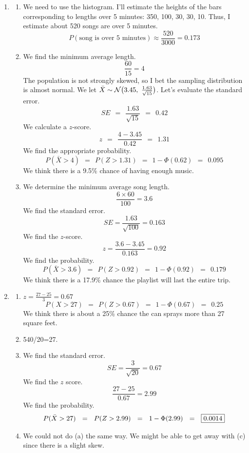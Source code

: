 \documentclass[12pt,letterpaper]{article}
\begin{document}
\begin{enumerate}
\item \begin{enumerate}
\item We need to use the histogram. I'll estimate the heights of the bars corresponding to lengths over 5 minutes: 350, 100, 30, 30, 10. Thus, I estimate about 520 songs are over 5 minutes.
$$P(\text{song is over 5 minutes}) \approx \frac{520}{3000} = 0.173 $$
\item We find the minimum average length.
$$\frac{60}{15} = 4 $$
The population is not strongly skewed, so I bet the sampling distribution is almost normal. We let $\bar{X}\sim \mathcal{N}\big(3.45,~\frac{1.63}{\sqrt{15}}\big)$. Let's evaluate the standard error.
$$SE ~~=~~ \frac{1.63}{\sqrt{15}} ~~=~~ 0.42 $$
We calculate a $z$-score.
$$z ~~=~~ \frac{4-3.45}{0.42} ~~=~~ 1.31 $$
We find the appropriate probability.
$$P(\bar{X} > 4) ~~=~~ P(Z > 1.31) ~~=~~ 1-\Phi(0.62) ~~=~~0.095 $$
We think there is a 9.5\% chance of having enough music.

\item We determine the minimum average song length.
$$\frac{6 \times 60}{100} = 3.6 $$
We find the standard error.
$$SE = \frac{1.63}{\sqrt{100}} = 0.163 $$
We find the $z$-score.
$$z = \frac{3.6-3.45}{0.163} = 0.92$$
We find the probability.
$$P(\bar{X}>3.6) ~~=~~ P(Z>0.92) ~~=~~ 1-\Phi(0.92) ~~=~~ 0.179 $$
We think there is a 17.9\% chance the playlist will last the entire trip.
\end{enumerate}

\newpage

\item \begin{enumerate}
\item $z=\frac{27-25}{3}=0.67$
$$P(X>27) ~~=~~ P(Z>0.67) ~~=~~ 1-\Phi(0.67) ~~=~~ 0.25 $$
We think there is about a 25\% chance the can sprays more than 27 square feet.
\item 540/20=27.
\item We find the standard error.
$$SE = \frac{3}{\sqrt{20}} = 0.67 $$
We find the $z$ score.
$$\frac{27-25}{0.67} = 2.99$$
We find the probability.
$$P(\bar{X}>27) ~~=~~ P(Z>2.99) ~~=~~ 1-\Phi(2.99) ~~=~~ \fbox{0.0014} $$
\item We could not do (a) the same way. We might be able to get away with (c) since there is a slight skew.
\end{enumerate}

\end{enumerate}
\end{document}
